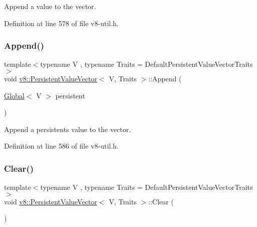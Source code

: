 Append a value to the vector. 

Definition at line 578 of file v8-\/util.\+h.

\mbox{\label{classv8_1_1PersistentValueVector_ad076923fd0046196670e87e996582546}} 
\subsubsection{\texorpdfstring{Append()}{Append()}\hspace{0.1cm}{\footnotesize\ttfamily [2/2]}}
{\footnotesize\ttfamily template$<$typename V , typename Traits  = Default\+Persistent\+Value\+Vector\+Traits$>$ \\
void \mbox{\hyperlink{classv8_1_1PersistentValueVector}{v8\+::\+Persistent\+Value\+Vector}}$<$ V, Traits $>$\+::Append (\begin{DoxyParamCaption}\item[{\mbox{\hyperlink{classv8_1_1Global}{Global}}$<$ V $>$}]{persistent }\end{DoxyParamCaption})\hspace{0.3cm}{\ttfamily [inline]}}

Append a persistent\textquotesingle{}s value to the vector. 

Definition at line 586 of file v8-\/util.\+h.

\mbox{\label{classv8_1_1PersistentValueVector_ad07f449c2004b4f3d91e58cabde99a53}} 
\subsubsection{\texorpdfstring{Clear()}{Clear()}}
{\footnotesize\ttfamily template$<$typename V , typename Traits  = Default\+Persistent\+Value\+Vector\+Traits$>$ \\
void \mbox{\hyperlink{classv8_1_1PersistentValueVector}{v8\+::\+Persistent\+Value\+Vector}}$<$ V, Traits $>$\+::Clear (\begin{DoxyParamCaption}{ }\end{DoxyParamCaption})\hspace{0.3cm}{\ttfamily [inline]}}

